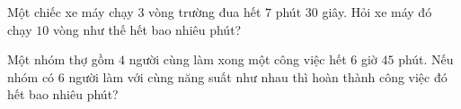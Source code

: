 \begin{ex} %
Một chiếc xe máy chạy $3$ vòng trường đua hết $7$ phút $30$ giây. Hỏi xe máy đó chạy $10$ vòng như thế hết bao nhiêu phút?
\end{ex}

\begin{ex} %
Một nhóm thợ gồm $4$ người cùng làm xong một công việc hết $6$ giờ $45$ phút. Nếu nhóm có $6$ người làm với cùng năng suất như nhau thì hoàn thành công việc đó hết bao nhiêu phút?
\end{ex}
